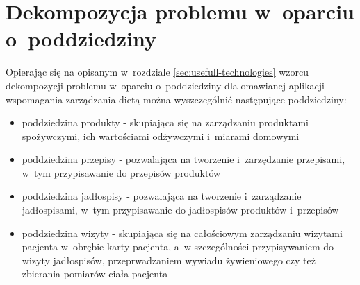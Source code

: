 \section{Dekompozycja problemu w~oparciu o~poddziedziny}\label{sec:problem-decomposition}
Opierając się na opisanym w~rozdziale \ref{sec:usefull-technologies} wzorcu dekompozycji problemu w~oparciu o~poddziedziny dla omawianej aplikacji wspomagania zarządzania dietą można wyszczególnić następujące poddziedziny:
\begin{itemize}
    \item poddziedzina produkty - skupiająca się na zarządzaniu produktami spożywczymi, ich wartościami odżywczymi i~miarami domowymi
    \item poddziedzina przepisy - pozwalająca na tworzenie i~zarzędzanie przepisami, w~tym przypisawanie do przepisów produktów
    \item poddziedzina jadłospisy - pozwalająca na tworzenie i~zarządzanie jadłospisami, w~tym przypisawanie do jadłospisów produktów i~przepisów
    \item poddziedzina wizyty - skupiająca się na całościowym zarządzaniu wizytami pacjenta w~obrębie karty pacjenta, a~w szczególności przypisywaniem do wizyty jadłospisów, przeprwadzaniem wywiadu żywieniowego czy też zbierania pomiarów ciała pacjenta
\end{itemize}

